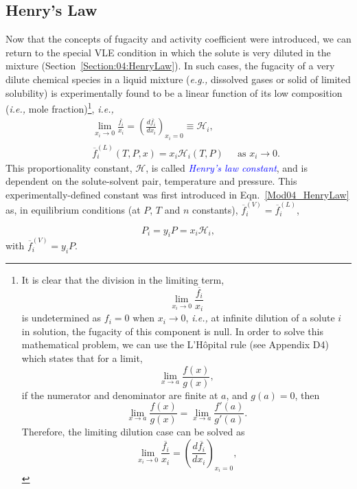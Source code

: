 \documentclass[12pts,a4paper,amsmath,amssymb,floatfix]{article}%
\newcommand{\frc}{\displaystyle\frac}
\newcommand{\blue}{\textcolor{blue}}
\newcommand{\eg}{{\it e.g., }}
\newcommand{\ie}{{\it i.e., }}
\newcommand{\mfr}[3][error]{#1_{#2}^{\left(#3\right)}}
\begin{document}
\subsection{Henry's Law}\label{Section:05:HenryLaw}
Now that the concepts of fugacity and activity coefficient were introduced, we can return to the special VLE condition in which the solute is very diluted in the mixture (Section~\ref{Section:04:HenryLaw}). In such cases, the fugacity of a very dilute chemical species in a liquid mixture (\eg dissolved gases or solid of limited solubility) is experimentally found to be a linear function of its low composition (\ie mole fraction)\footnote{It is clear that the division in the limiting term,
  \begin{displaymath}
    \lim\limits_{x_{i}\rightarrow 0}\frc{\overline{f_{i}}}{x_{i}}
  \end{displaymath}
  is undetermined as $f_{i}=0\text{ when }x_{i}\rightarrow 0$, \ie at infinite dilution of a solute $i$ in solution, the fugacity of this component is null. In order to solve this mathematical problem, we can use the L'H\^opital rule (see Appendix D4) which states that for a limit,
         \begin{displaymath}
                 \lim\limits_{x\rightarrow a}\frc{f(x)}{g(x)},
         \end{displaymath}
         if the numerator and denominator are finite at $a$, and $g(a)=0$, then
         \begin{displaymath}
                 \lim\limits_{x\rightarrow a}\frc{f(x)}{g(x)} =  \lim\limits_{x\rightarrow a}\frc{f'(a)}{g'(a)}.
         \end{displaymath}
         Therefore, the limiting dilution case can be solved as
         \begin{displaymath}
                 \lim\limits_{x_{i}\rightarrow 0}\frc{\overline{f_{i}}}{x_{i}} = \left(\frc{d \overline{f_{i}}}{d x_{i}}\right)_{x_{i}=0},
         \end{displaymath}
}, \ie   
      \begin{eqnarray}
        && \lim\limits_{x_{i}\rightarrow 0}\frc{\overline{f_{i}}}{x_{i}} = \left(\frc{d \overline{f_{i}}}{d x_{i}}\right)_{x_{i}=0}  \equiv \mathcal{H}_{i}, \nonumber \\
        && \mfr[\overline{f}]{i}{L}(T,P,x) = x_{i}\mathcal{H}_{i}(T,P)\;\;\;\;\text{ as } x_{i}\rightarrow 0.
      \end{eqnarray}      
This proportionality constant, $\mathcal{H}$, is called \blue{\it Henry's law constant}, and is dependent on the solute-solvent pair, temperature and pressure. This experimentally-defined constant was first introduced in Eqn.~\ref{Mod04_HenryLaw} as, in equilibrium conditions (at $P$, $T$ and $n$ constants), $\mfr[\overline{f}]{i}{V}=\mfr[\overline{f}]{i}{L}$,
         \begin{shaded}
           \begin{displaymath}
             P_{i} = y_{i}P = x_{i}\mathcal{H}_{i},
           \end{displaymath}
           with $\mfr[\overline{f}]{i}{V}=y_{i}P$.
        \end{shaded}
%
\end{document}
